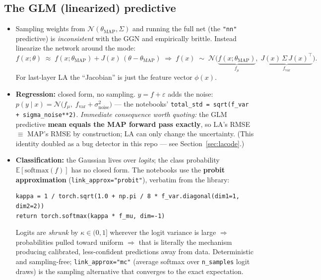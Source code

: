 \documentclass[10pt,a4paper]{article}
\newcommand{\code}[1]{\texttt{#1}}
\newcommand{\map}{\mathrm{MAP}}
\begin{document}
\subsection{The GLM (linearized) predictive}
\begin{itemize}
\item Sampling weights from $\mathcal{N}(\theta_\map,\Sigma)$ and running the full net (the
  \code{"nn"} predictive) is \emph{inconsistent} with the GGN and empirically brittle. Instead
  linearize the network around the mode:
  \[
  f(x;\theta)\;\approx\;f(x;\theta_\map)+J(x)\,(\theta-\theta_\map)
  \;\Rightarrow\;
  f(x)\;\sim\;\mathcal{N}\bigl(\underbrace{f(x;\theta_\map)}_{f_\mu},\;
  \underbrace{J(x)\,\Sigma\,J(x)^\top}_{f_{\mathrm{var}}}\bigr).
  \]
  For last-layer LA the ``Jacobian'' is just the feature vector $\phi(x)$.
\item \textbf{Regression:} closed form, no sampling. $y=f+\varepsilon$ adds the noise:
  $p(y\mid x)=\mathcal{N}\bigl(f_\mu,\; f_{\mathrm{var}}+\sigma_{\text{noise}}^2\bigr)$ --- the
  notebooks' \code{total\_std = sqrt(f\_var + sigma\_noise**2)}.
  \emph{Immediate consequence worth quoting:} the GLM predictive \textbf{mean equals the MAP
  forward pass exactly}, so LA's RMSE $\equiv$ MAP's RMSE by construction; LA can only change the
  uncertainty. (This identity doubled as a bug detector in this repo --- see
  Section~\ref{sec:lacode}.)
\item \textbf{Classification:} the Gaussian lives over \emph{logits}; the class probability
  $\mathbb{E}[\mathrm{softmax}(f)]$ has no closed form. The notebooks use the \textbf{probit
  approximation} (\code{link\_approx="probit"}), verbatim from the library:
\begin{lstlisting}
kappa = 1 / torch.sqrt(1.0 + np.pi / 8 * f_var.diagonal(dim1=1, dim2=2))
return torch.softmax(kappa * f_mu, dim=-1)
\end{lstlisting}
  Logits are \emph{shrunk} by $\kappa\in(0,1]$ wherever the logit variance is large
  $\Rightarrow$ probabilities pulled toward uniform $\Rightarrow$ that is literally the mechanism
  producing calibrated, less-confident predictions away from data. Deterministic and
  sampling-free; \code{link\_approx="mc"} (average softmax over \code{n\_samples} logit draws) is
  the sampling alternative that converges to the exact expectation.
\end{itemize}
\end{document}
